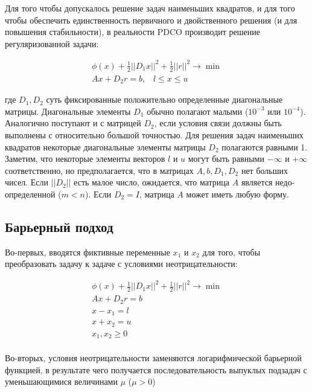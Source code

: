 \documentclass[a4paper, 12pt, titlepage]{article}
\theoremstyle{definition}
\theoremstyle{plain}
\theoremstyle{plain}
\begin{document}
Для того чтобы допускалось решение задач наименьших квадратов, и для того чтобы
обеспечить единственность первичного и двойственного решения (и для повышения
стабильности), в реальности PDCO производит решение регуляризованной задачи:

\begin{equation}
 \begin{aligned}
  \phi(x) + \frac{1}{2}||D_{1} x||^{2} + \frac{1}{2}||r||^{2} \to \min \\
  A x + D_{2} r = b, \;\;\; l \leq x \leq u
 \end{aligned}
\end{equation}

где $D_{1}, D_{2}$ суть фиксированные положительно определенные диагональные
матрицы. Диагональные элементы $D_{1}$ обычно полагают малыми ($10^{-3}$ или
$10^{-4}$). Аналогично поступают и с матрицей $D_{2}$, если условия связи
должны быть выполнены с относительно большой точностью. Для решения задач
наименьших квадратов некоторые диагональные элементы матрицы $D_{2}$ полагаются
равными 1. Заметим, что некоторые элементы векторов $l$ и $u$ могут быть 
равными $-\infty$ и $+\infty$ соответственно, но предполагается, что в матрицах
$A, b, D_{1}, D_{2}$ нет больших чисел. Если $||D_{2}||$ есть малое число,
ожидается, что матрица $A$ является недо-определенной ($m < n$). Если
$D_{2} = I$, матрица $A$ может иметь любую форму.

\subsection{Барьерный подход}
Во-первых, вводятся фиктивные переменные $x_{1}$ и $x_{2}$ для того, чтобы
преобразовать задачу к задаче с условиями неотрицательности:

\begin{equation}
 \label{eq:co}
 \begin{aligned}
  \phi(x) + \frac{1}{2}||D_{1} x||^{2} + \frac{1}{2}||r||^{2} \to \min \\
  A x + D_{2} r = b \\
  x - x_{1} = l \\
  x + x_{2} = u \\
  x_{1}, x_{2} \geq 0 \\
 \end{aligned}
\end{equation}

Во-вторых, условия неотрицательности заменяются логарифмической барьерной
функцией, в результате чего получается последовательность выпуклых подзадач с
уменьшающимися величинами $\mu$ ($\mu > 0$)
\end{document}

